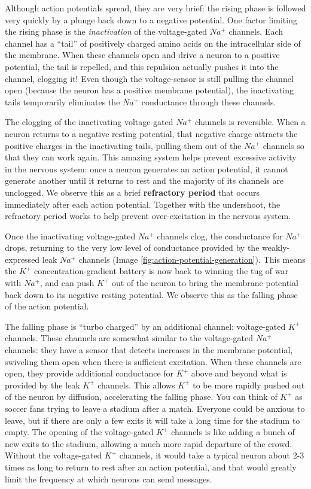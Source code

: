 \documentclass[
]{book}
\begin{document}
Although action potentials spread, they are very brief: the rising phase is followed very quickly by a plunge back down to a negative potential. One factor limiting the rising phase is the \emph{inactivation} of the voltage-gated \(Na^+\) channels. Each channel has a ``tail'' of positively charged amino acids on the intracellular side of the membrane. When these channels open and drive a neuron to a positive potential, the tail is repelled, and this repulsion actually pushes it into the channel, clogging it! Even though the voltage-sensor is still pulling the channel open (because the neuron has a positive membrane potential), the inactivating tails temporarily eliminates the \(Na^+\) conductance through these channels.

The clogging of the inactivating voltage-gated \(Na^+\) channels is reversible. When a neuron returns to a negative resting potential, that negative charge attracts the positive charges in the inactivating tails, pulling them out of the \(Na^+\) channels so that they can work again. This amazing system helps prevent excessive activity in the nervous system: once a neuron generates an action potential, it cannot generate another until it returns to rest and the majority of its channels are unclogged. We observe this as a brief \textbf{refractory period} that occurs immediately after each action potential. Together with the undershoot, the refractory period works to help prevent over-excitation in the nervous system.

Once the inactivating voltage-gated \(Na^+\) channels clog, the conductance for \(Na^+\) drops, returning to the very low level of conductance provided by the weakly-expressed leak \(Na^+\) channels (Image \ref{fig:action-potential-generation}). This means the \(K^+\) concentration-gradient battery is now back to winning the tug of war with \(Na^+\), and can push \(K^+\) out of the neuron to bring the membrane potential back down to its negative resting potential. We observe this as the falling phase of the action potential.

The falling phase is ``turbo charged'' by an additional channel: voltage-gated \(K^+\) channels. These channels are somewhat similar to the voltage-gated \(Na^+\) channels: they have a sensor that detects increases in the membrane potential, swiveling them open when there is sufficient excitation. When these channels are open, they provide additional conductance for \(K^+\) above and beyond what is provided by the leak \(K^+\) channels. This allows \(K^+\) to be more rapidly pushed out of the neuron by diffusion, accelerating the falling phase. You can think of \(K^+\) as soccer fans trying to leave a stadium after a match. Everyone could be anxious to leave, but if there are only a few exits it will take a long time for the stadium to empty. The opening of the voltage-gated \(K^+\) channels is like adding a bunch of new exits to the stadium, allowing a much more rapid departure of the crowd. Without the voltage-gated \(K^+\) channels, it would take a typical neuron about 2-3 times as long to return to rest after an action potential, and that would greatly limit the frequency at which neurons can send messages.
\end{document}
